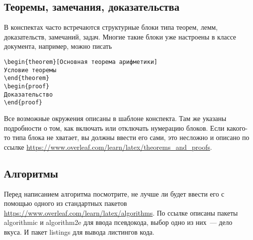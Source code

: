 \documentclass{article}
\begin{document}
    \subsection{Теоремы, замечания, доказательства}

    В конспектах часто встречаются структурные блоки типа теорем, лемм, доказательств, замечаний, задач.
    Многие такие блоки уже настроены в классе документа, например, можно писать
    \begin{verbatim}
\begin{theorem}[Основная теорема арифметики]
Условие теоремы
\end{theorem}
\begin{proof}
Доказательство
\end{proof}
    \end{verbatim}
    Все возможные окружения описаны в шаблоне конспекта.
    Там же указаны подробности о том, как включать или отключать нумерацию блоков.
    Если какого-то типа блока не хватает, вы должны ввести его сами, это несложно и описано по ссылке \url{https://www.overleaf.com/learn/latex/theorems_and_proofs}.

    \subsection{Алгоритмы}
    Перед написанием алгоритма посмотрите, не лучше ли будет ввести его с помощью одного из стандартных пакетов
    \url{https://www.overleaf.com/learn/latex/algorithms}. По ссылке описаны пакеты algorithmic и algorithm2e для
    ввода псевдокода, выбор одно из них~--- дело вкуса. И пакет listings для вывода листингов кода.
\end{document}
